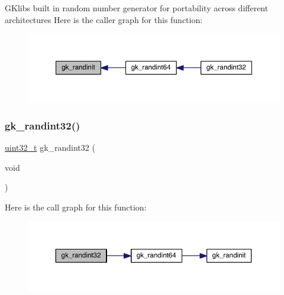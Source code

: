 G\+Klib\textquotesingle{}s built in random number generator for portability across different architectures Here is the caller graph for this function\+:\nopagebreak
\begin{figure}[H]
\begin{center}
\leavevmode
\includegraphics[width=350pt]{a00077_a6a9fc2e9810099e03edc40607a7ea8aa_icgraph}
\end{center}
\end{figure}
\mbox{\label{a00077_a8e801d60d0dbdf0213d39cf210cddf11}} 
\subsubsection{\texorpdfstring{gk\+\_\+randint32()}{gk\_randint32()}}
{\footnotesize\ttfamily \hyperlink{a00119_a6eb1e68cc391dd753bc8ce896dbb8315}{uint32\+\_\+t} gk\+\_\+randint32 (\begin{DoxyParamCaption}\item[{void}]{ }\end{DoxyParamCaption})}

Here is the call graph for this function\+:\nopagebreak
\begin{figure}[H]
\begin{center}
\leavevmode
\includegraphics[width=350pt]{a00077_a8e801d60d0dbdf0213d39cf210cddf11_cgraph}
\end{center}
\end{figure}
\mbox{\label{a00077_a2a2322fc19f0dfd85b92cf6325c743a2}} 
